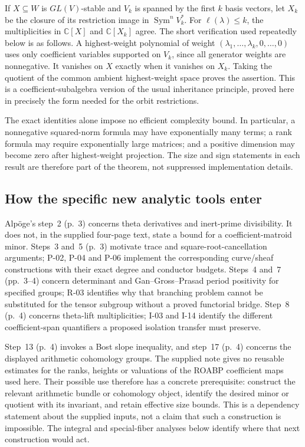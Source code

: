 \documentclass[11pt,a4paper]{article}
\theoremstyle{definition}\newtheorem{definition}{Definition}
\begin{document}
If $X\subseteq W$ is $GL(V)$-stable and $V_k$ is spanned by the first $k$ basis vectors, let $X_k$ be the closure of its restriction image in $\operatorname{Sym}^nV_k^*$. For $\ell(\lambda)\leq k$, the multiplicities in $\mathbb C[X]$ and $\mathbb C[X_k]$ agree. The short verification used repeatedly below is as follows. A highest-weight polynomial of weight $(\lambda_1,\ldots,\lambda_k,0,\ldots,0)$ uses only coefficient variables supported on $V_k$, since all generator weights are nonnegative. It vanishes on $X$ exactly when it vanishes on $X_k$. Taking the quotient of the common ambient highest-weight space proves the assertion. This is a coefficient-subalgebra version of the usual inheritance principle, proved here in precisely the form needed for the orbit restrictions.

The exact identities alone impose no efficient complexity bound. In particular, a nonnegative squared-norm formula may have exponentially many terms; a rank formula may require exponentially large matrices; and a positive dimension may become zero after highest-weight projection. The size and sign statements in each result are therefore part of the theorem, not suppressed implementation details.

\subsection{How the specific new analytic tools enter}

Alp\"oge's step~2 (p.~3) concerns theta derivatives and inert-prime divisibility. It does not, in the supplied four-page text, state a bound for a coefficient-matroid minor. Steps~3 and~5 (p.~3) motivate trace and square-root-cancellation arguments; P-02, P-04 and P-06 implement the corresponding curve/sheaf constructions with their exact degree and conductor budgets. Steps~4 and~7 (pp.~3--4) concern determinant and Gan--Gross--Prasad period positivity for specified groups; R-03 identifies why that branching problem cannot be substituted for the tensor subgroup without a proved functorial bridge. Step~8 (p.~4) concerns theta-lift multiplicities; I-03 and I-14 identify the different coefficient-span quantifiers a proposed isolation transfer must preserve.

Step~13 (p.~4) invokes a Bost slope inequality, and step~17 (p.~4) concerns the displayed arithmetic cohomology groups. The supplied note gives no reusable estimates for the ranks, heights or valuations of the ROABP coefficient maps used here. Their possible use therefore has a concrete prerequisite: construct the relevant arithmetic bundle or cohomology object, identify the desired minor or quotient with its invariant, and retain effective size bounds. This is a dependency statement about the supplied inputs, not a claim that such a construction is impossible. The integral and special-fiber analyses below identify where that next construction would act.
\end{document}
